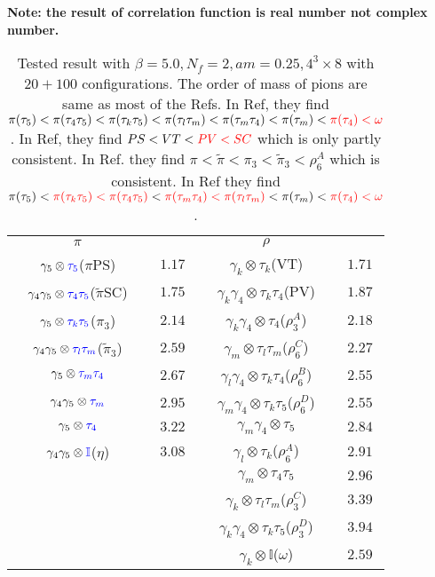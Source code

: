 \textcolor[rgb]{0,0,1}{\textbf{Note: the result of correlation function is real number not complex number.}}


\begin{table}
\begin{center}
\begin{tabular}{cc|cc}
\hline
 $\pi$ & & $\rho$ & \\
$\gamma_5 \otimes \textcolor[rgb]{0,0,1}{\tau _5}$($\pi$PS) & $1.17$ & $\gamma_k\otimes \tau_k$(VT) & $1.71$ \\
$\gamma _4\gamma _5\otimes \textcolor[rgb]{0,0,1}{\tau _4\tau _5}$($\tilde{\pi}$SC) & $1.75$ & $\gamma_k\gamma_4\otimes \tau_k\tau_4$(PV) & $1.87$ \\
$\gamma_5 \otimes \textcolor[rgb]{0,0,1}{\tau _k\tau _5}$($\pi_3$) & $2.14$ & $\gamma_k\gamma _4\otimes \tau_4$($\rho_3^A$) & $2.18$ \\
$\gamma _4\gamma_5 \otimes \textcolor[rgb]{0,0,1}{\tau _l\tau _m}$($\tilde{\pi}_3$) & $2.59$ & $\gamma_m\otimes \tau _l\tau_m$($\rho_6^C$) & $2.27$ \\
$\gamma_5 \otimes \textcolor[rgb]{0,0,1}{\tau _m\tau _4}$ & $2.67$ & $\gamma_l\gamma _4\otimes \tau_k\tau _4$($\rho_6^B$) & $2.55$ \\
$\gamma _4\gamma_5 \otimes \textcolor[rgb]{0,0,1}{\tau _m}$ & $2.95$ & $\gamma_m\gamma _4\otimes \tau _k\tau_5$($\rho_6^D$) & $2.55$\\
$\gamma_5 \otimes \textcolor[rgb]{0,0,1}{\tau _4}$ & $3.22$ & $\gamma_m\gamma _4\otimes \tau_5$ & $2.84$\\
$\gamma _4\gamma_5 \otimes \textcolor[rgb]{0,0,1}{\mathbb{I}}$($\eta$) & $3.08$ & $\gamma_l\otimes \tau_k$($\rho_6^A$) & $2.91$ \\
 & & $\gamma_m\otimes \tau _4\tau_5$ & $2.96$ \\
 & & $\gamma_k\otimes \tau_l\tau _m$($\rho_3^C$) & $3.39$ \\
 & & $\gamma_k\gamma _4\otimes \tau_k\tau _5$($\rho_3^D$) & $3.94$ \\
 & & $\gamma_k\otimes \mathbb{I}$($\omega$) & $2.59$ \\
\hline
\end{tabular}
\end{center}
\caption{\label{tab:staggeredMeson2}Tested result with $\beta=5.0,N_f=2,am=0.25,4^3\times 8$ with $20+100$ configurations. The order of mass of pions are same as most of the Refs. In Ref, they find $\pi(\tau _5)<\pi(\tau _4\tau _5)<\pi(\tau _k\tau _5)<\pi(\tau _l\tau _m)<\pi(\tau _m\tau _4)<\pi(\tau _m)<\textcolor[rgb]{1,0,0}{\pi(\tau _4)<\omega}$. In Ref, they find $PS<VT<\textcolor[rgb]{1,0,0}{PV<SC}$ which is only partly consistent. In Ref. they find $\pi < \tilde{\pi} < \pi_3 < \tilde{\pi}_3<\rho_6^A$ which is consistent. In Ref they find $\pi(\tau _5)<\textcolor[rgb]{1,0,0}{\pi(\tau _k\tau _5)<\pi(\tau _4\tau _5)}<\textcolor[rgb]{1,0,0}{\pi(\tau _m\tau _4)<\pi(\tau _l\tau _m)}<\pi(\tau _m)<\textcolor[rgb]{1,0,0}{\pi(\tau _4)<\omega}$.}
\end{table} 

